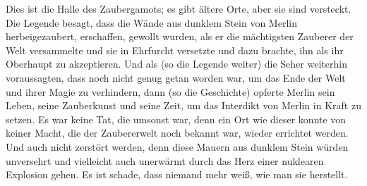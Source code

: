 Dies ist die Halle des Zaubergamots; es gibt ältere Orte, aber sie sind versteckt. Die Legende besagt, dass die Wände aus dunklem Stein von Merlin herbeigezaubert, erschaffen, gewollt wurden, als er die mächtigsten Zauberer der Welt versammelte und sie in Ehrfurcht versetzte und dazu brachte, ihn als ihr Oberhaupt zu akzeptieren. Und als (so die Legende weiter) die Seher weiterhin voraussagten, dass noch nicht genug getan worden war, um das Ende der Welt und ihrer Magie zu verhindern, dann (so die Geschichte) opferte Merlin sein Leben, seine Zauberkunst und seine Zeit, um das Interdikt von Merlin in Kraft zu setzen. Es war keine Tat, die umsonst war, denn ein Ort wie dieser konnte von keiner Macht, die der Zaubererwelt noch bekannt war, wieder errichtet werden. Und auch nicht zerstört werden, denn diese Mauern aus dunklem Stein würden unversehrt und vielleicht auch unerwärmt durch das Herz einer nuklearen Explosion gehen. Es ist schade, dass niemand mehr weiß, wie man sie herstellt.

